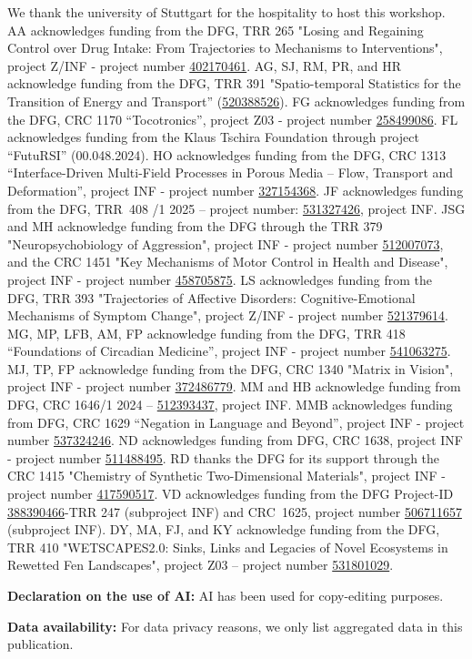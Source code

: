 \documentclass{eceasst}
\newcommand{\geprislink}[1]{\href{https://gepris.dfg.de/gepris/projekt/#1?language=en}{#1}}
\newenvironment{aiuse}{%
  \par\vspace{11pt}%
  \noindent\textbf{Declaration on the use of AI:}\enspace}{%
  \par\vspace{11pt}}
\newenvironment{data}{%
  \par\vspace{11pt}%
  \noindent\textbf{Data availability:}\enspace}{%
  \par\vspace{11pt}}
\begin{document}
\begin{acknowledge}
We thank the university of Stuttgart for the hospitality to host this workshop.
AA acknowledges funding from the DFG, TRR 265 "Losing and Regaining Control over Drug Intake: From Trajectories to Mechanisms to Interventions", project  Z/INF - project number \geprislink{402170461}.
AG, SJ, RM, PR, and HR acknowledge funding from the DFG, TRR 391 "Spatio-temporal Statistics for the Transition of Energy and Transport'' (\geprislink{520388526}).
FG acknowledges funding from the DFG, CRC 1170 “Tocotronics”, project Z03 - project number \geprislink{258499086}.
FL acknowledges funding from the Klaus Tschira Foundation through project “FutuRSI” (00.048.2024).
HO acknowledges funding from the DFG, CRC 1313 “Interface-Driven Multi-Field Processes in Porous Media – Flow, Transport and Deformation”, project INF - project number \geprislink{327154368}.
JF acknowledges funding from the DFG, TRR~408 /1 2025 – project number: \geprislink{531327426}, project INF.
JSG and MH acknowledge funding from the DFG through the TRR 379 "Neuropsychobiology of Aggression", project INF - project number \geprislink{512007073}, and the CRC 1451 "Key Mechanisms of Motor Control in Health and Disease", project INF - project number \geprislink{458705875}.
LS acknowledges funding from the DFG, TRR 393 "Trajectories of Affective Disorders: Cognitive-Emotional Mechanisms of Symptom Change", project  Z/INF - project number \geprislink{521379614}.
MG, MP, LFB, AM, FP acknowledge funding from the DFG, TRR 418 ``Foundations of Circadian Medicine'', project INF - project number \geprislink{541063275}.
MJ, TP, FP acknowledge funding from the DFG, CRC 1340 "Matrix in Vision", project INF - project number \geprislink{372486779}.
MM and HB acknowledge funding from DFG, CRC 1646/1 2024 -- \geprislink{512393437}, project INF.
MMB acknowledges funding from DFG, CRC 1629 ``Negation in Language and Beyond'', project INF - project number \geprislink{537324246}.
ND acknowledges funding from DFG, CRC 1638, project INF - project number \geprislink{511488495}.
RD thanks the DFG for its support through the CRC 1415 "Chemistry of Synthetic Two-Dimensional Materials", project INF - project number \geprislink{417590517}.
VD acknowledges funding from the DFG Project-ID \geprislink{388390466}-TRR 247 (subproject INF) and CRC~1625, project number \geprislink{506711657} (subproject INF).
DY, MA, FJ, and KY acknowledge funding from the DFG, TRR 410 "WETSCAPES2.0: Sinks, Links and Legacies of Novel Ecosystems in Rewetted Fen Landscapes", project Z03 -- project number \geprislink{531801029}.
\end{acknowledge}

\begin{aiuse}
AI has been used for copy-editing purposes.
\end{aiuse}

\begin{data}
For data privacy reasons, we only list aggregated data in this publication.
\end{data}



\end{document}
